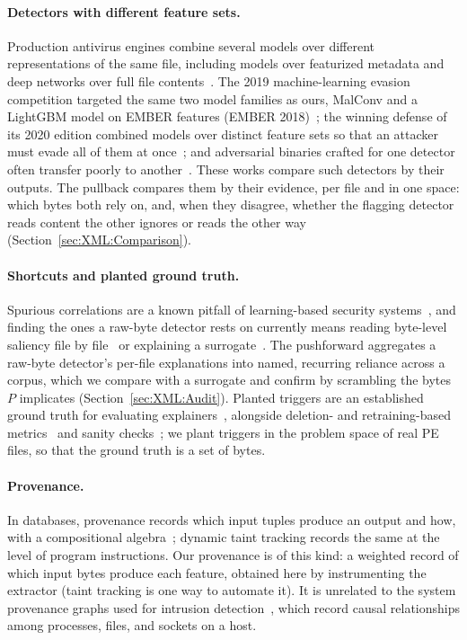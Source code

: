 \paragraph{Detectors with different feature sets.} Production antivirus engines combine several models over different representations of the same file, including models over featurized metadata and deep networks over full file contents~\cite{microsoft2019insideout}. The 2019 machine-learning evasion competition targeted the same two model families as ours, MalConv and a LightGBM model on EMBER features (EMBER 2018)~\cite{endgame2019mlsec}; the winning defense of its 2020 edition combined models over distinct feature sets so that an attacker must evade all of them at once~\cite{quiring2020against}; and adversarial binaries crafted for one detector often transfer poorly to another~\cite{salman2024robustness}. These works compare such detectors by their outputs. The pullback compares them by their evidence, per file and in one space: which bytes both rely on, and, when they disagree, whether the flagging detector reads content the other ignores or reads the other way (Section~\ref{sec:XML:Comparison}).

\paragraph{Shortcuts and planted ground truth.} Spurious correlations are a known pitfall of learning-based security systems~\cite{arp2022and}, and finding the ones a raw-byte detector rests on currently means reading byte-level saliency file by file~\cite{demetrio2019explaining, bose2020explaining} or explaining a surrogate~\cite{mohammed2026beyond}. The pushforward aggregates a raw-byte detector's per-file explanations into named, recurring reliance across a corpus, which we compare with a surrogate and confirm by scrambling the bytes $P$ implicates (Section~\ref{sec:XML:Audit}). Planted triggers are an established ground truth for evaluating explainers~\cite{lin2021what}, alongside deletion- and retraining-based metrics~\cite{petsiuk2018rise, hooker2019benchmark} and sanity checks~\cite{adebayo2018sanity}; we plant triggers in the problem space of real PE files, so that the ground truth is a set of bytes.

\paragraph{Provenance.} In databases, provenance records which input tuples produce an output and how, with a compositional algebra~\cite{green2007provenance}; dynamic taint tracking records the same at the level of program instructions. Our provenance is of this kind: a weighted record of which input bytes produce each feature, obtained here by instrumenting the extractor (taint tracking is one way to automate it). It is unrelated to the system provenance graphs used for intrusion detection~\cite{cheng2024kairos, milajerdi2019poirot}, which record causal relationships among processes, files, and sockets on a host.
